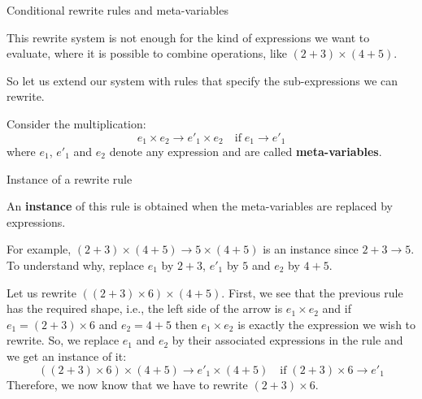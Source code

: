 \documentclass[compress,dvipdfmx]{beamer}
\begin{document}
%
\begin{frame}{Conditional rewrite rules and meta-variables}

  This rewrite system is not enough for the kind of expressions we
  want to evaluate, where it is possible to combine operations, like
  \((2+3) \times (4+5)\).

  \bigskip

  So let us extend our system with rules that specify the
  sub-expressions we can rewrite.

  \bigskip

  Consider the multiplication:
  \begin{equation*}
    e_1 \times e_2 \rightarrow e'_1 \times e_2 \quad \text{if} \; e_1
    \rightarrow e'_1
  \end{equation*}
  where \(e_1\), \(e'_1\) and \(e_2\) denote any expression and are
  called \textbf{meta\hyp{}variables}.

\end{frame}

%
\begin{frame}{Instance of a rewrite rule}

  An \textbf{instance} of this rule is obtained when the
  meta-variables are replaced by expressions.

  \bigskip

  For example, \( (2+3) \times (4+5) \rightarrow 5 \times (4+5) \) is
  an instance since \(2 + 3 \rightarrow 5\). To understand why,
  replace \(e_1\) by \(2+3\), \(e'_1\) by \(5\) and \(e_2\) by
  \(4+5\).

  \bigskip

  Let us rewrite \(((2 + 3) \times 6) \times (4+5)\). First, we see
  that the previous rule has the required shape, i.e., the left side
  of the arrow is \(e_1 \times e_2\) and if \(e_1 = (2+3) \times 6\)
  and \(e_2 = 4+5\) then \(e_1 \times e_2\) is exactly the expression
  we wish to rewrite. So, we replace \(e_1\) and \(e_2\) by their
  associated expressions in the rule and we get an instance of it:
  \begin{equation*}
    ((2 + 3) \times 6) \times (4+5) \rightarrow e'_1 \times (4+5)
    \quad \text{if} \; (2+3) \times 6 \rightarrow e'_1
  \end{equation*}
  Therefore, we now know that we have to rewrite \((2 + 3) \times 6\).

\end{frame}
\end{document}
